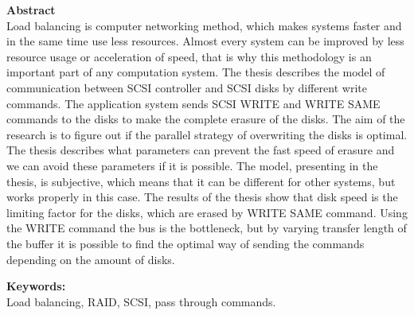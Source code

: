 {\bf Abstract}\\



Load balancing is computer networking method, which makes systems faster and in the same time use less resources. Almost every system can be improved by less resource usage or acceleration of speed, that is why this methodology is an important part of any computation system. The thesis describes the model of communication between SCSI controller and SCSI disks by different write commands. The application system sends SCSI WRITE and WRITE SAME commands to the disks to make the complete erasure of the disks. The aim of the research is to figure out if the parallel strategy of overwriting the disks is optimal. The thesis describes what parameters can prevent the fast speed of erasure and we can avoid these parameters if it is possible. The model, presenting in the thesis, is subjective, which means that it can be different for other systems, but works properly in this case. The results of the thesis show that disk speed is the limiting factor for the disks, which are erased by WRITE SAME command. Using the WRITE command the bus is the bottleneck, but by varying transfer length of the buffer it is possible to find the optimal way of sending the commands depending on the amount of disks.





{\bf Keywords:}\\
Load balancing, RAID, SCSI, pass through commands.
